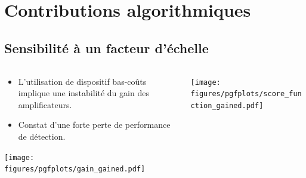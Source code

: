 \documentclass[../main.tex]{subfiles}
\begin{document}
\section{Contributions algorithmiques}

\subsection{Sensibilité à un facteur d'échelle}

\begin{frame}{\subsecname}
  \begin{columns}
    \begin{column}{.5\linewidth}
      \centering
      \begin{itemize}
        \item L'utilisation de dispositif bas-coûts implique une instabilité du gain des amplificateurs.
        \item Constat d'une forte perte de performance de détection.
      \end{itemize} \vspace*{1 em}

      \texttt{[image: figures/pgfplots/gain\_gained.pdf]}
    \end{column}
    \begin{column}{.5\linewidth}
      \texttt{[image: figures/pgfplots/score\_function\_gained.pdf]}
    \end{column}
  \end{columns}
\end{frame}
\end{document}
